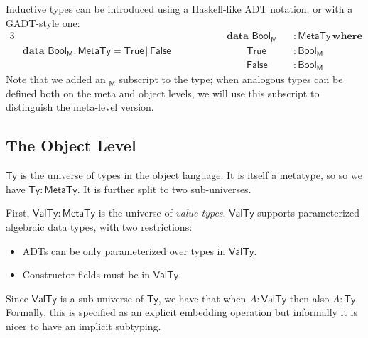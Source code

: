\documentclass[acmsmall,screen,review,anonymous]{acmart}
\newcommand{\msf}[1]{\mathsf{#1}}
\newcommand{\mbf}[1]{\mathbf{#1}}
\newcommand{\bs}[1]{\boldsymbol{#1}}
\newcommand{\ind}{\hspace{1em}}
\newcommand{\data}{\mbf{data}\,}
\newcommand{\where}{\mbf{where}}
\newcommand{\M}{\msf{M}}
\newcommand{\Bool}{\msf{Bool}}
\newcommand{\MTy}{\msf{MetaTy}}
\newcommand{\VTy}{\msf{ValTy}}
\newcommand{\Ty}{\msf{Ty}}
\newcommand{\True}{\msf{True}}
\newcommand{\False}{\msf{False}}
\begin{document}
Inductive types can be introduced using a Haskell-like ADT notation, or with a GADT-style one:
\begin{alignat*}{3}
  &                                           &&\hspace{4em}\data\,\Bool_\M &&: \MTy\,\where\\
  & \data\,\Bool_\M : \MTy = \True\,|\,\False &&\hspace{4em}\ind\ind \True &&: \Bool_\M\\
  &                                           &&\hspace{4em}\ind\ind \False &&: \Bool_\M
\end{alignat*}
Note that we added an $_\M$ subscript to the type; when analogous types can be
defined both on the meta and object levels, we will use this subscript to
distinguish the meta-level version.

\subsection{The Object Level}\label{sec:the-object-level}

$\bs{\Ty}$ is the universe of types in the object language. It is itself a
metatype, so so we have $\Ty : \MTy$. It is further split to two sub-universes.

First, $\bs{\VTy} : \MTy$ is the universe of \emph{value types}. $\VTy$ supports
parameterized algebraic data types, with two restrictions:
\begin{itemize}
\item ADTs can be only parameterized over types in $\VTy$.
\item Constructor fields must be in $\VTy$.
\end{itemize}
Since $\VTy$ is a sub-universe of $\Ty$, we have that when $A : \VTy$ then also
$A : \Ty$. Formally, this is specified as an explicit embedding operation but
informally it is nicer to have an implicit subtyping.
\end{document}
